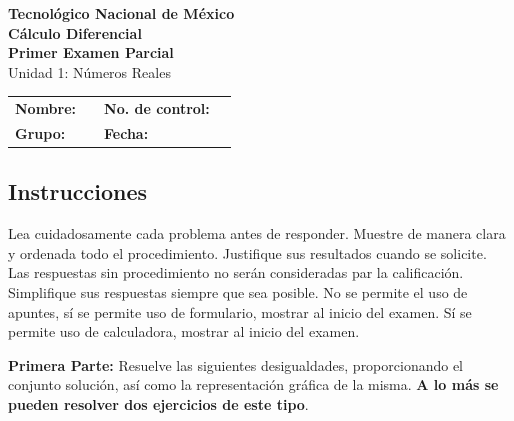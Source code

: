 \documentclass[12pt]{article}
\newcommand{\institucion}{Tecnológico Nacional de México}
\newcommand{\materia}{Cálculo Diferencial}
\newcommand{\nombreexamen}{Primer Examen Parcial}
\newcommand{\unidad}{Unidad 1: Números Reales}
\newcounter{problema}
\begin{document}

\begin{center}
    {\Large\textbf{\institucion}}\\[0.3em]
    {\large\textbf{\materia}}\\[0.3em]
    {\large\textbf{\nombreexamen}}\\[0.3em]
    {\normalsize\unidad}
\end{center}

\vspace{0.05em}


\begin{tabularx}{\textwidth}{>{\bfseries}l X >{\bfseries}l X}
Nombre: & \hrulefill &
No. de control: & \hrulefill \\[1.2em]

Grupo: & \hrulefill &
Fecha: & \hrulefill \\[0.05em]

\end{tabularx}

\vspace{0.05em}



\subsection*{Instrucciones}
Lea cuidadosamente cada problema antes de responder. Muestre de manera clara y ordenada todo el procedimiento. Justifique sus resultados cuando se solicite. Las respuestas sin procedimiento no serán consideradas par la calificaci\'on. Simplifique sus respuestas siempre que sea posible. No se permite el uso de apuntes, sí se permite uso de formulario, mostrar al inicio del examen. Sí se permite uso de calculadora, mostrar al inicio del examen.

\textbf{Primera Parte:} Resuelve las siguientes desigualdades, proporcionando el conjunto  solución, así como la representación gráfica de  la misma. \textbf{A lo m\'as se pueden resolver dos ejercicios de este tipo}.
\end{document}

